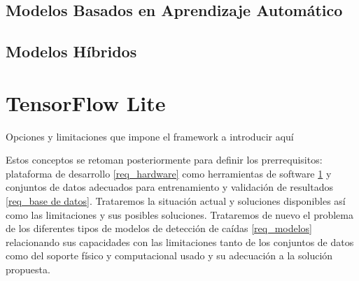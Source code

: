 \documentclass[../tfm.tex]{subfiles}
\begin{document}
\subsection{Modelos Basados en Aprendizaje Automático}

\subsection{Modelos Híbridos}

\section{TensorFlow Lite} \label{req_tflite}
Opciones y limitaciones que impone el framework a introducir aquí



 Estos conceptos se retoman posteriormente para definir los prerrequisitos: plataforma de desarrollo \ref{req_hardware} como herramientas de software \ref{req_tflite} y conjuntos de datos adecuados para entrenamiento y validación de resultados \ref{req_base de datos}. Trataremos la situación actual y soluciones disponibles así como las limitaciones y sus posibles soluciones. Trataremos de nuevo el problema de los diferentes tipos de modelos de detección de caídas \ref{req_modelos} relacionando sus capacidades con las limitaciones tanto de los conjuntos de datos como del soporte físico y computacional usado y su adecuación a la solución propuesta.
\end{document}
